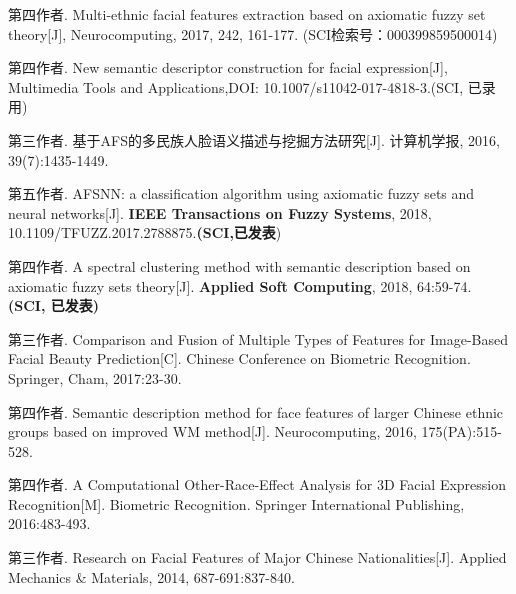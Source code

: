 \begin{resume}
\begin{enumerate}[{[}1{]}]
\end{enumerate}
\begin{enumerate}[{[}1{]}]
\item  第四作者. Multi-ethnic facial features extraction based on axiomatic fuzzy set theory[J], Neurocomputing, 2017, 242, 161-177. (SCI检索号：000399859500014)

\item 第四作者. New semantic descriptor construction for facial expression[J], Multimedia Tools and Applications,DOI: 10.1007/s11042-017-4818-3.(SCI, 已录用)

\item 第三作者. 基于AFS的多民族人脸语义描述与挖掘方法研究[J]. 计算机学报, 2016, 39(7):1435-1449.

\item 第五作者. AFSNN: a classification algorithm using axiomatic fuzzy sets and neural networks[J]. \textbf{IEEE Transactions on Fuzzy Systems}, 2018, 10.1109/TFUZZ.2017.2788875.\textbf{(SCI,已发表})

\item 第四作者. A spectral clustering method with semantic description based on axiomatic fuzzy sets theory[J]. \textbf{Applied Soft Computing}, 2018, 64:59-74. \textbf{(SCI, 已发表)}


\item 第三作者.  Comparison and Fusion of Multiple Types of Features for Image-Based Facial Beauty Prediction[C]. Chinese Conference on Biometric Recognition. Springer, Cham, 2017:23-30.

\item 第四作者.  Semantic description method for face features of larger Chinese ethnic groups based on improved WM method[J]. Neurocomputing, 2016, 175(PA):515-528.

\item 第四作者.  A Computational Other-Race-Effect Analysis for 3D Facial Expression Recognition[M]. Biometric Recognition. Springer International Publishing, 2016:483-493.

\item 第三作者. Research on Facial Features of Major Chinese Nationalities[J]. Applied Mechanics \& Materials, 2014, 687-691:837-840.



\end{enumerate}
\end{resume}
